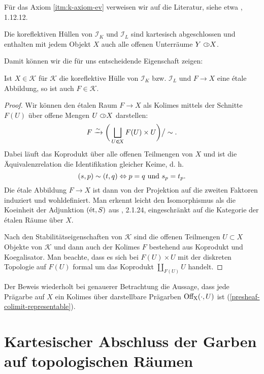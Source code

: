 Für das Axiom \ref{itm:k-axiom-ev} verweisen wir auf die Literatur,
siehe etwa \cite{TM}, 1.12.12.

\begin{kor}
  Die koreflektiven Hüllen von $\mathcal{I}_K$ und $\mathcal{I}_L$
  sind kartesisch abgeschlossen und enthalten mit jedem Objekt $X$
  auch alle offenen Unterräume $Y \subset\kern-0.58em\circ X$.
\end{kor}

Damit können wir die für uns entscheidende Eigenschaft zeigen:
\begin{prop} \label{k-etale-closed}
  Ist $X \in \mathcal{K}$ für $\mathcal{K}$ die koreflektive Hülle von
  $\mathcal{I}_K$ bzw. $\mathcal{I}_L$ und $F \to X$ eine étale
  Abbildung, so ist auch $F \in \mathcal{K}$.
\end{prop}
\begin{proof}
  Wir können den étalen Raum $F \to X$ als Kolimes mittels der
  Schnitte $F(U)$ über offene Mengen $U \subset\kern-0.58em\circ X$ darstellen:
  \[ F \xrightarrow[]{\sim} \bigg( \bigsqcup_{U \subset\kern-0.58em\circ X} F(U) \times U \bigg) \big/ \sim. \]
  Dabei läuft das Koprodukt über alle offenen Teilmengen von $X$ und
  ist die Äquivalenzrelation die Identifikation gleicher Keime, d. h.
  \[ (s, p) \sim (t, q) \Leftrightarrow p = q \text{ und } s_p = t_p. \]
  Die étale Abbildung $F \to X$ ist dann von der Projektion auf die
  zweiten Faktoren induziert und wohldefiniert. Man erkennt leicht den
  Isomorphismus als die Koeinheit der Adjunktion $(\mathrm{\acute{e}t}, S)$ aus
  \cite{TG}, 2.1.24, eingeschränkt auf die Kategorie der étalen Räume
  über $X$.

  Nach den Stabilitätseigenschaften von $\mathcal{K}$ sind die offenen
  Teilmengen $U \subset X$ Objekte von $\mathcal{K}$ und dann auch der
  Kolimes $F$ bestehend aus Koprodukt und Koegalisator. Man beachte,
  dass es sich bei $F(U) \times U$ mit der diskreten Topologie auf
  $F(U)$ formal um das Koprodukt $\coprod_{F(U)} U$ handelt.
\end{proof}
\begin{bem}
  Der Beweis wiederholt bei genauerer Betrachtung die Aussage, dass
  jede Prägarbe auf $X$ ein Kolimes über darstellbare Prägarben
  $\operatorname{Off_X}(\cdot, U)$ ist (\ref{presheaf-colimit-representable}).
\end{bem}

\section[Kartesischer Abschluss der Garben auf topologischen Räumen]
        {\texorpdfstring
          {Kartesischer Abschluss der Garben\\ auf topologischen Räumen}
          {Kartesischer Abschluss der Garben auf topologischen Räumen}}
\label{sec:enstop-cart-closed}

